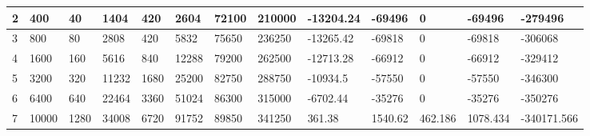 \begin{table}[]
{\begin{tabular}{|l|l|l|l|l|l|l|l|l|l|l|l|l|}
        2     & 400       & 40            & 1404                                                  & 420                                                            & 2604                                                     & 72100                                                      & 210000                                                          & -13204.24 & -69496     & 0             & -69496           & -279496         \\ \hline
        3     & 800       & 80            & 2808                                                  & 420                                                            & 5832                                                     & 75650                                                      & 236250                                                          & -13265.42 & -69818     & 0             & -69818           & -306068         \\ \hline
        4     & 1600      & 160           & 5616                                                  & 840                                                            & 12288                                                    & 79200                                                      & 262500                                                          & -12713.28 & -66912     & 0             & -66912           & -329412         \\ \hline
        5     & 3200      & 320           & 11232                                                 & 1680                                                           & 25200                                                    & 82750                                                      & 288750                                                          & -10934.5  & -57550     & 0             & -57550           & -346300         \\ \hline
        6     & 6400      & 640           & 22464                                                 & 3360                                                           & 51024                                                    & 86300                                                      & 315000                                                          & -6702.44  & -35276     & 0             & -35276           & -350276         \\ \hline
        7     & 10000     & 1280          & 34008                                                 & 6720                                                           & 91752                                                    & 89850                                                      & 341250                                                          & 361.38    & 1540.62    & 462.186       & 1078.434         & -340171.566     \\ \hline

\end{tabular}}
\end{table}
